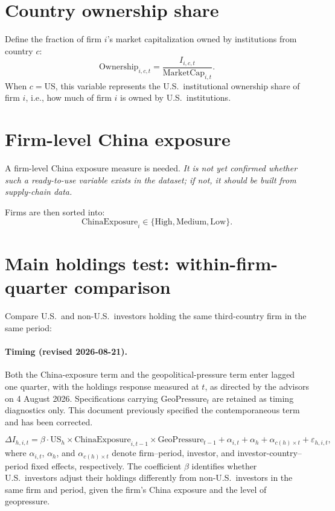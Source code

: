 \documentclass[11pt]{article}
\begin{document}
\section{Country ownership share}

Define the fraction of firm $i$'s market capitalization owned by institutions from country $c$:
\[
\text{Ownership}_{i,c,t} = \frac{I_{i,c,t}}{\text{MarketCap}_{i,t}}.
\]
When $c = \text{US}$, this variable represents the U.S.\ institutional ownership share of firm $i$, i.e., how much of firm $i$ is owned by U.S.\ institutions.

\section{Firm-level China exposure}

A firm-level China exposure measure is needed. \emph{It is not yet confirmed whether such a ready-to-use variable exists in the dataset; if not, it should be built from supply-chain data.}

Firms are then sorted into:
\[
\text{ChinaExposure}_i \in \{\text{High}, \text{Medium}, \text{Low}\}.
\]

\section{Main holdings test: within-firm-quarter comparison}

Compare U.S.\ and non-U.S.\ investors holding the same third-country firm in the same period:
\paragraph{Timing (revised 2026-08-21).} Both the China-exposure term and the geopolitical-pressure term enter lagged one quarter, with the holdings response measured at $t$, as directed by the advisors on 4 August 2026. Specifications carrying $\text{GeoPressure}_t$ are retained as timing diagnostics only. This document previously specified the contemporaneous term and has been corrected.

\[
\Delta I_{h,i,t}
= \beta \cdot \text{US}_h \times \text{ChinaExposure}_{i,t-1} \times \text{GeoPressure}_{t-1}
+ \alpha_{i,t} + \alpha_{h} + \alpha_{c(h) \times t}
+ \varepsilon_{h,i,t},
\]
where $\alpha_{i,t}$, $\alpha_{h}$, and $\alpha_{c(h) \times t}$ denote firm--period, investor, and investor-country--period fixed effects, respectively. The coefficient $\beta$ identifies whether U.S.\ investors adjust their holdings differently from non-U.S.\ investors in the same firm and period, given the firm's China exposure and the level of geopressure.
\end{document}
